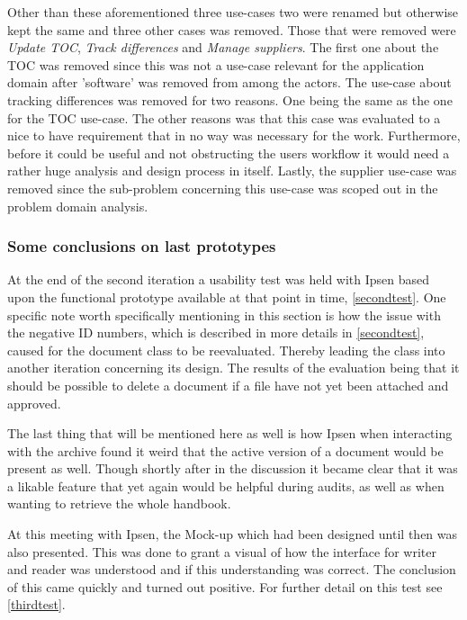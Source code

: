 Other than these aforementioned three use-cases two were renamed but otherwise kept the same and three other cases was removed.
Those that were removed were \textit{Update TOC}, \textit{Track differences} and \textit{Manage suppliers}.
The first one about the TOC was removed since this was not a use-case relevant for the application domain after 'software' was removed from among the actors.
The use-case about tracking differences was removed for two reasons.
One being the same as the one for the TOC use-case.
The other reasons was that this case was evaluated to a nice to have requirement that in no way was necessary for the work.
Furthermore, before it could be useful and not obstructing the users workflow it would need a rather huge analysis and design process in itself.
Lastly, the supplier use-case was removed since the sub-problem concerning this use-case was scoped out in the problem domain analysis.

\subsubsection*{Some conclusions on last prototypes}
At the end of the second iteration a usability test was held with Ipsen based upon the functional prototype available at that point in time, \cref{secondtest}.
One specific note worth specifically mentioning in this section is how the issue with the negative ID numbers, which is described in more details in \cref{secondtest}, caused for the document class to be reevaluated.
Thereby leading the class into another iteration concerning its design.
The results of the evaluation being that it should be possible to delete a document if a file have not yet been attached and approved.

The last thing that will be mentioned here as well is how Ipsen when interacting with the archive found it weird that the active version of a document would be present as well.
Though shortly after in the discussion it became clear that it was a likable feature that yet again would be helpful during audits, as well as when wanting to retrieve the whole handbook.

At this meeting with Ipsen, the Mock-up which had been designed until then was also presented.
This was done  to grant a visual of how the interface for writer and reader was understood and if this understanding was correct.
The conclusion of this came quickly and turned out positive.
For further detail on this test see \cref{thirdtest}.


